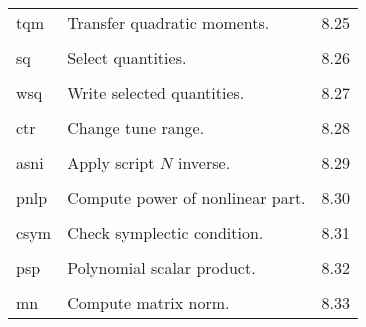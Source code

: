\begin{center}
\begin{tabular}{lll}
\hspace{1.5em}tqm    &           Transfer quadratic moments.   &  \hspace{2em}8.25\\
\vspace{-3mm}& &\\
\hspace{1.5em}sq      &           Select quantities.       &      \hspace{2em}8.26\\
\vspace{-3mm}& &\\
\hspace{1.5em}wsq     &           Write selected quantities.  &    \hspace{2em}8.27\\
\vspace{-3mm}& &\\
\hspace{1.5em}ctr     &           Change tune range.         &   \hspace{2em}8.28\\
\vspace{-3mm}& &\\
\hspace{1.5em}asni    &           Apply script $N$ inverse.     &   \hspace{2em}8.29\\
\vspace{-3mm}& &\\
\hspace{1.5em}pnlp    &           Compute power of nonlinear part. & \hspace{2em}8.30\\
\vspace{-3mm}& &\\
\hspace{1.5em}csym    &           Check symplectic condition.   &   \hspace{2em}8.31\\
\vspace{-3mm}& &\\
\hspace{1.5em}psp    &           Polynomial scalar product. & \hspace{2em}8.32\\
\vspace{-3mm}& &\\
\hspace{1.5em}mn    &           Compute matrix norm. & \hspace{2em}8.33\\

\end{tabular}
\end{center}
